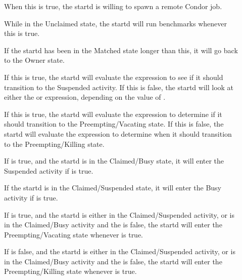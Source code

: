\begin{description}
  
\item[] When this is true, the startd is willing to spawn
  a remote Condor job.
  
\item[] While in the Unclaimed state, the startd
  will run benchmarks whenever this is true.
  
\item[] If the startd has been in the Matched
  state longer than this, it will go back to the Owner state.
  
\item[] If this is true, the startd will evaluate
  the  expression to see if it should transition to the
  Suspended activity.  If this is false, the startd will look at
  either the  or  expression, depending on the
  value of .
  
\item[] If this is true, the startd will evaluate
  the  expression to determine if it should transition to
  the Preempting/Vacating state.  If this is false, the startd will
  evaluate the  expression to determine when it should
  transition to the Preempting/Killing state.
  
\item[] If  is true, and the startd
  is in the Claimed/Busy state, it will enter the Suspended activity
  if  is true.
  
\item[] If the startd is in the Claimed/Suspended
  state, it will enter the Busy activity if  is true.
  
\item[] If  is true, and the startd is
  either in the Claimed/Suspended activity, or is in the Claimed/Busy
  activity and the  is false, the startd will
  enter the Preempting/Vacating state whenever  is true.
  
\item[] If  is false, and the startd is
  either in the Claimed/Suspended activity, or is in the Claimed/Busy
  activity and the  is false, the startd will
  enter the Preempting/Killing state whenever  is true.
  

\end{description}

